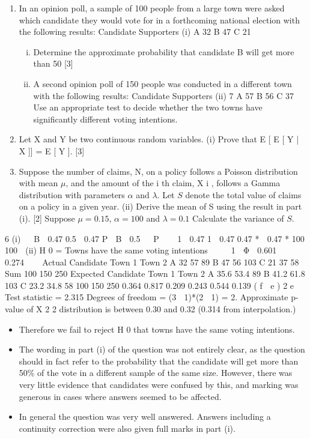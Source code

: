 \documentclass[a4paper,12pt]{article}
\begin{document}
\begin{enumerate}
\item In an opinion poll, a sample of 100 people from a large town were asked which
candidate they would vote for in a forthcoming national election with the following
results:
Candidate
Supporters
(i)
A
32
B
47
C
21
\begin{enumerate}[(i)]
\item Determine the approximate probability that candidate B will get more than
50%
[3]
\item A second opinion poll of 150 people was conducted in a different town with the
following results:
Candidate
Supporters
(ii)
7
A
57
B
56
C
37
Use an appropriate test to decide whether the two towns have significantly
different voting intentions.
\end{enumerate}

\item Let X and Y be two continuous random variables.
(i)
Prove that E [ E [ Y | X ]] = E [ Y ].
[3]
\item Suppose the number of claims, N, on a policy follows a Poisson distribution with mean $\mu$, and the amount of the i th claim, X i , follows a Gamma distribution with
parameters $\alpha$ and $\lambda$. Let $S$ denote the total value of claims on a policy in a given year.
(ii)
Derive the mean of S using the result in part (i).
[2]
Suppose $\mu = 0.15$, $\alpha=100$ and $\lambda =0.1$ 
Calculate the variance of $S$.
\end{enumerate}
\newpage
6
(i) 

B  0.47
0.5  0.47
P  B  0.5   P 


1  0.47
1  0.47
0.47 *
 0.47 *
100
100

(ii) H 0 = Towns have the same voting intentions


  1  Φ  0.601   0.274



Actual Candidate
Town 1
Town 2 A
32
57
89 B
47
56
103 C
21
37
58 Sum
100
150
250
Expected Candidate
Town 1
Town 2 A
35.6
53.4
89 B
41.2
61.8
103 C
23.2
34.8
58 100
150
250
0.364 0.817 0.209 0.243 0.544 0.139
( f  e ) 2
e
Test statistic = 2.315
Degrees of freedom = (3  1)*(2  1) = 2. Approximate p-value of X 2 2
distribution is between 0.30 and 0.32 (0.314 from interpolation.)
\begin{itemize}
\item Therefore we fail to reject H 0 that towns have the same voting intentions.
\item The wording in part (i) of the question was not entirely clear, as the question should in fact refer to the probability that the candidate will get more than 50\% of the vote in a different sample of the same size. However, there was very little evidence that candidates were confused by this, and marking was generous in cases where answers seemed to be affected. 
\item In general the question was very well answered. Answers including a continuity correction
were also given full marks in part (i).
\end{itemize}
\end{document}
